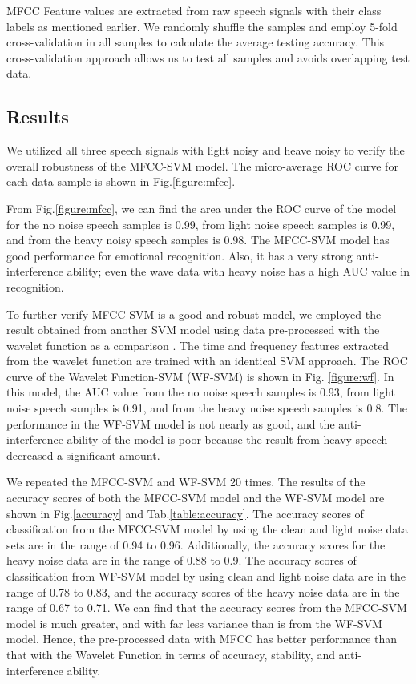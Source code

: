 \documentclass[12pt]{article}
\begin{document}
\begin{multicols*}{2}
MFCC Feature values are extracted from raw speech signals with their class labels as mentioned earlier. We randomly shuffle the samples and employ 5-fold cross-validation in all samples to calculate the average testing accuracy. This cross-validation approach allows us to test all samples and avoids overlapping test data.

\subsection*{Results}
We utilized all three speech signals with light noisy and heave noisy to verify the overall robustness of the MFCC-SVM model. The micro-average ROC curve for each data sample is shown in Fig.\ref{figure:mfcc}.

From Fig.\ref{figure:mfcc}, we can find the area under the ROC curve of the model for the no noise speech samples is 0.99, from light noise speech samples is 0.99, and from the heavy noisy speech samples is 0.98. The MFCC-SVM model has good performance for emotional recognition. Also, it has a very strong anti-interference ability; even the wave data with heavy noise has a high AUC value in recognition. 

To further verify MFCC-SVM is a good and robust model, we employed the result obtained from another SVM model using data pre-processed with the wavelet function as a comparison \cite{zhang2004wavelet}. The time and frequency features extracted from the wavelet function are trained with an identical SVM approach. The ROC curve of the Wavelet Function-SVM (WF-SVM) is shown in Fig. \ref{figure:wf}. In this model, the AUC value from the no noise speech samples is 0.93, from light noise speech samples is 0.91, and from the heavy noise speech samples is 0.8. The performance in the WF-SVM model is not nearly as good, and the anti-interference ability of the model is poor because the result from heavy speech decreased a significant amount.

We repeated the MFCC-SVM and WF-SVM 20 times. The results of the accuracy scores of both the MFCC-SVM model and the WF-SVM model are shown in Fig.\ref{accuracy} and Tab.\ref{table:accuracy}. The accuracy scores of classification from the MFCC-SVM model by using the clean and light noise data sets are in the range of 0.94 to 0.96. Additionally, the accuracy scores for the heavy noise data are in the range of 0.88 to 0.9. The accuracy scores of classification from WF-SVM model by using clean and light noise data are in the range of 0.78 to 0.83, and the accuracy scores of the heavy noise data are in the range of 0.67 to 0.71. We can find that the accuracy scores from the MFCC-SVM model is much greater, and with far less variance than is from the WF-SVM model. Hence, the pre-processed data with MFCC has better performance than that with the Wavelet Function in terms of accuracy, stability, and anti-interference ability.


\end{multicols*}
\end{document}
